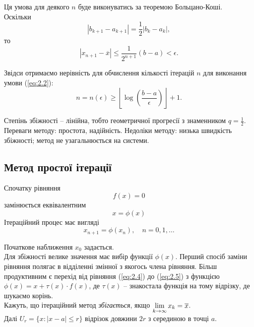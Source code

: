 Ця умова для деякого $n$ буде виконуватись за теоремою Больцано-Коші. \\

Оскільки
\[ |b_{k + 1} - a_{k + 1} | = \dfrac12 |b_k - a_k|, \]
то
\begin{equation}
	\label{eq:2.3}
	|x_{n+1} - \overline{x}| \le \dfrac{1}{2^{n+1}} (b - a) < \epsilon.
\end{equation}

Звідси отримаємо нерівність для обчислення кількості ітерацій $n$ для виконання умови (\ref{eq:2.2}):
\[ n = n(\epsilon) \ge \left\lfloor \log\left(\dfrac{b-a}{\epsilon}\right) \right\rfloor + 1. \]

Степінь збіжності -- лінійна, тобто геометричної прогресії з знаменником $q = \frac12$. \\

Переваги методу: простота, надійність. Недоліки методу: низька швидкість збіжності; метод не узагальнюється на системи. 

\subsection{Метод простої ітерації}

Спочатку рівняння
\begin{equation}
	\label{eq:2.4}
	f (x) = 0
\end{equation}
замінюється еквівалентним
\begin{equation}
	\label{eq:2.5}
	x = \phi(x)
\end{equation}
Ітераційний процес має вигляді
\begin{equation}
	\label{eq:2.6}
	x_{n+1} = \phi(x_n), \quad n = 0,1,\ldots
\end{equation}

Початкове наближення $x_0$ задається. \\

Для збіжності велике значення має вибір функції $\phi(x)$. Перший спосіб заміни рівняння полягає в відділенні змінної з якогось члена рівняння. Більш продуктивним є перехід від рівняння (\ref{eq:2.4}) до (\ref{eq:2.5}) з функцією $\phi (x) = x + \tau (x) \cdot f (x)$, де $\tau (x)$ -- знакостала функція на тому відрізку, де шукаємо корінь. \\

Кажуть, що ітераційний метод \textit{збігається}, якщо $\displaystyle\lim\limits_{k\to\infty} x_k = \overline{x}$. \\

Далі $U_r = \{x : |x - a| \le r\}$ відрізок довжини $2r$ з серединою в точці $a$. \\

